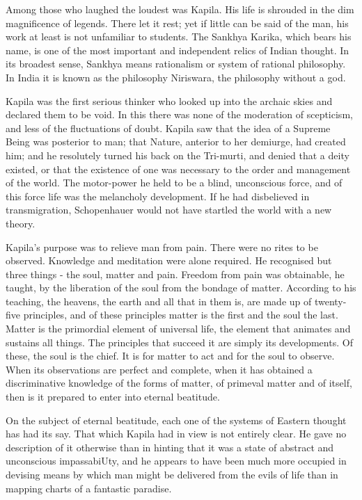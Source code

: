 \documentclass[]{book}
\begin{document}
Among those who laughed the loudest was Kapila. His life is shrouded in
the dim magnificence of legends. There let it rest; yet if little can be
said of the man, his work at least is not unfamiliar to students. The
Sankhya Karika, which bears his name, is one of the most important and
independent relics of Indian thought. In its broadest sense, Sankhya
means rationalism or system of rational philosophy. In India it is known
as the philosophy Niriswara, the philosophy without a god.

Kapila was the first serious thinker who looked up into the archaic
skies and declared them to be void. In this there was none of the
moderation of scepticism, and less of the fluctuations of doubt. Kapila
saw that the idea of a Supreme Being was posterior to man; that Nature,
anterior to her demiurge, had created him; and he resolutely turned his
back on the Tri-murti, and denied that a deity existed, or that the
existence of one was necessary to the order and management of the world.
The motor-power he held to be a blind, unconscious force, and of this
force life was the melancholy development. If he had disbelieved in
transmigration, Schopenhauer would not have startled the world with a
new theory.

Kapila's purpose was to relieve man from pain. There were no rites to be
observed. Knowledge and meditation were alone required. He recognised
but three things - the soul, matter and pain. Freedom from pain was
obtainable, he taught, by the liberation of the soul from the bondage of
matter. According to his teaching, the heavens, the earth and all that
in them is, are made up of twenty-five principles, and of these
principles matter is the first and the soul the last. Matter is the
primordial element of universal life, the element that animates and
sustains all things. The principles that succeed it are simply its
developments. Of these, the soul is the chief. It is for matter to act
and for the soul to observe. When its observations are perfect and
complete, when it has obtained a discriminative knowledge of the forms
of matter, of primeval matter and of itself, then is it prepared to
enter into eternal beatitude.

On the subject of eternal beatitude, each one of the systems of Eastern
thought has had its say. That which Kapila had in view is not entirely
clear. He gave no description of it otherwise than in hinting that it
was a state of abstract and unconscious impassabiUty, and he appears to
have been much more occupied in devising means by which man might be
delivered from the evils of life than in mapping charts of a fantastic
paradise.
\end{document}
